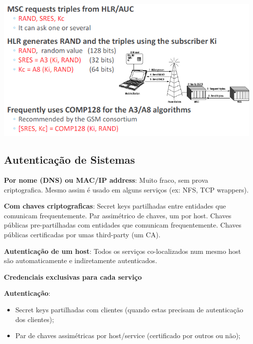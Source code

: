 \documentclass{article}
\begin{document}
\pagebreak

\begin{center}
  \includegraphics[scale=0.6]{25}
\end{center}

\subsection{Autenticação de Sistemas}

\begin{flushleft}
  \textbf{Por nome (DNS) ou MAC/IP address}: Muito fraco, sem prova
  criptografica. Mesmo assim é usado em alguns serviços (ex: NFS, TCP wrappers).

  \vspace{2mm}

  \textbf{Com chaves criptograficas}: Secret keys partilhadas entre entidades que
  comunicam frequentemente. Par assimétrico de chaves, um por host.
  Chaves públicas pre-partilhadas com entidades que comunicam frequentemente.
  Chaves públicas certificadas por umas third-party (um CA).

  \vspace{2mm}

  \textbf{Autenticação de um host}: Todos os serviços co-localizados num mesmo
  host são automaticamente e indiretamente autenticados.

  \vspace{2mm}

  \textbf{Credenciais exclusivas para cada serviço}

  \vspace{2mm}

  \textbf{Autenticação}:
  \begin{itemize}
    \item Secret keys partilhadas com clientes (quando estas precisam
    de autenticação dos clientes);
    \item Par de chaves assimétricas por host/service (certificado por outros ou não);
  \end{itemize}
\end{flushleft}
\end{document}
